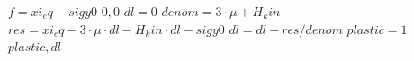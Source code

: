 

\begin{algorithmic}
\State $f = xi_eq - sigy0$
    \Return $0, 0$
\EndIf
\State $dl = 0$
\State $denom = 3 \cdot \mu + H_kin$
    \State $res = xi_eq - 3 \cdot \mu \cdot dl - H_kin \cdot dl - sigy0$
    \State $dl = dl + res / denom$
\EndFor
\State $plastic = 1$
\Return $plastic, dl$
\end{algorithmic}
